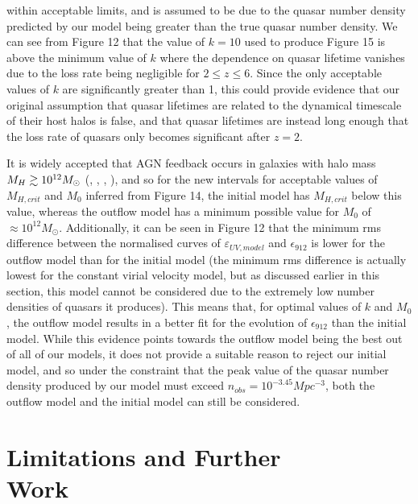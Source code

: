 \documentclass[12pt]{article}%
\begin{document}
\twocolumngrid


\noindent within acceptable limits, and is assumed to be due to the quasar number density predicted by our model being greater than the true quasar number density. We can see from Figure 12 that the value of $k=10$ used to produce Figure 15 is above the minimum value of $k$ where the dependence on quasar lifetime vanishes due to the loss rate being negligible for $2\leq z\leq6$. Since the only acceptable values of $k$ are significantly greater than 1, this could provide evidence that our original assumption that quasar lifetimes are related to the dynamical timescale of their host halos is false, and that quasar lifetimes are instead long enough that the loss rate of quasars only becomes significant after $z=2$.

It is widely accepted that AGN feedback occurs in galaxies with halo mass \hspace{1mm} $M_H\gtrsim10^{12}\\M_\odot$ (\cite{Ikea}, \cite{Byrne}, \cite{Bassini}, \cite{Somerville}), and so for the new intervals for acceptable values of $M_{H,crit}$ and $M_0$ inferred from Figure 14, the initial model has $M_{H,crit}$ below this value, whereas the outflow model has a minimum possible value for $M_0$ of $\approx10^{12}M_\odot$. Additionally, it can be seen in Figure 12 that the minimum rms difference between the normalised curves of $\varepsilon_{UV,model}$ and $\epsilon_{912}$ is lower for the outflow model than for the initial model (the minimum rms difference is actually lowest for the constant virial velocity model, but as discussed earlier in this section, this model cannot be considered due to the extremely low number densities of quasars it produces). This means that, for optimal values of $k$ and $M_0$, the outflow model results in a better fit for the evolution of $\epsilon_{912}$ than the initial model. While this evidence points towards the outflow model being the best out of all of our models, it does not provide a suitable reason to reject our initial model, and so under the constraint that the peak value of the quasar number density produced by our model must exceed $n_{obs}=10^{-3.45}Mpc^{-3}$, both the outflow model and the initial model can still be considered.

\section{Limitations and Further\\Work}
\end{document}
